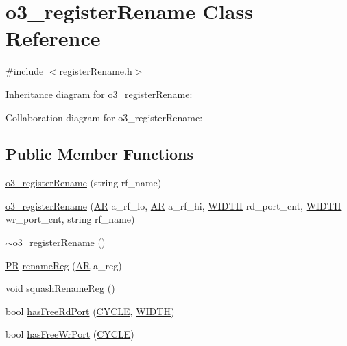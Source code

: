 \hypertarget{classo3__registerRename}{
\section{o3\_\-registerRename Class Reference}
\label{classo3__registerRename}
}


{\ttfamily \#include $<$registerRename.h$>$}



Inheritance diagram for o3\_\-registerRename:


Collaboration diagram for o3\_\-registerRename:
\subsection*{Public Member Functions}
\begin{DoxyCompactItemize}
\item 
\hyperlink{classo3__registerRename_afc40fa21233d279d229970c3a982a9b8}{o3\_\-registerRename} (string rf\_\-name)
\item 
\hyperlink{classo3__registerRename_a177992bb922a67442166f5cc0a1c09fe}{o3\_\-registerRename} (\hyperlink{global_2global_8h_a735ca3cb7fa17e60af6701a846722516}{AR} a\_\-rf\_\-lo, \hyperlink{global_2global_8h_a735ca3cb7fa17e60af6701a846722516}{AR} a\_\-rf\_\-hi, \hyperlink{global_2global_8h_a6fa2e24b8a418fa215e183264cbea3aa}{WIDTH} rd\_\-port\_\-cnt, \hyperlink{global_2global_8h_a6fa2e24b8a418fa215e183264cbea3aa}{WIDTH} wr\_\-port\_\-cnt, string rf\_\-name)
\item 
\hyperlink{classo3__registerRename_ad8e4b3165b84c89ba73d622c58f8b65f}{$\sim$o3\_\-registerRename} ()
\item 
\hyperlink{global_2global_8h_a54dcae2ba04c76c12afe113b706bd4dc}{PR} \hyperlink{classo3__registerRename_a1e65eca8eb066cf294a056d015469992}{renameReg} (\hyperlink{global_2global_8h_a735ca3cb7fa17e60af6701a846722516}{AR} a\_\-reg)
\item 
void \hyperlink{classo3__registerRename_a72f6bb205743c3bbbe41c47584208c90}{squashRenameReg} ()
\item 
bool \hyperlink{classo3__registerRename_a641c81a3e668177ef756fbeaa7c0998f}{hasFreeRdPort} (\hyperlink{global_2global_8h_a7e19a550ec11d1ed921deb20c22efb5b}{CYCLE}, \hyperlink{global_2global_8h_a6fa2e24b8a418fa215e183264cbea3aa}{WIDTH})
\item 
bool \hyperlink{classo3__registerRename_aad6b322839a5349fd6895944f3907ff2}{hasFreeWrPort} (\hyperlink{global_2global_8h_a7e19a550ec11d1ed921deb20c22efb5b}{CYCLE})

\end{DoxyCompactItemize}
